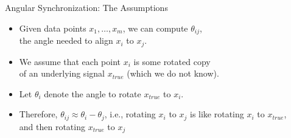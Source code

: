 \documentclass[10pt]{beamer}
\begin{document}
\begin{frame}{Angular Synchronization: The Assumptions}

\begin{itemize}
\item Given data points $x_1, \dots, x_m$, we can compute $\theta_{ij}$, \\the angle needed to align $x_i$ to $x_j$.
\item We assume that each point $x_i$ is some rotated copy \\of an underlying signal $x_{true}$ (which we do not know).
\item Let $\theta_i$ denote the angle to rotate $x_{true}$ to $x_i$.
\item Therefore, $\theta_{ij} \approx \theta_i - \theta_j$, i.e., rotating $x_i$ to $x_j$ is like rotating $x_i$ to $x_{true}$, \\and then rotating $x_{true}$ to $x_j$

\end{itemize}

\begin{center}

\end{center}

\end{frame}
\end{document}
